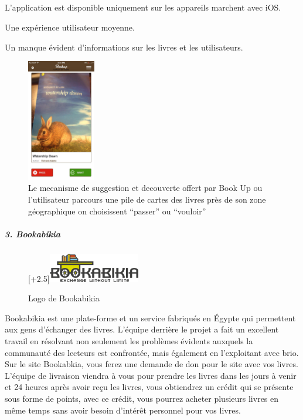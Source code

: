 \subparagraph*{}
\begin{list}{•}{\textbf{Inconvénients}}
	\item L'application est disponible uniquement sur les appareils marchent avec iOS.
	\item Une expérience utilisateur moyenne.
	\item Un manque évident d'informations sur les livres et les utilisateurs.
\end{list}

\begin{figure}[h]
	\begin{center}
		\includegraphics[width=3cm]{Images/chapter1/bookUpScreenshot.jpg}
		\caption{\footnotesize {Le mecanisme de suggestion et decouverte offert par Book Up ou l'utilisateur parcours une pile de cartes des livres près de son zone géographique on choisissent “passer” ou “vouloir”}}
	\end{center}
\end{figure}
\newpage

\subparagraph{{\large 3. Bookabikia\medskip \\}}

\begin{figure}
	\raisebox{0pt}[\dimexpr\height+2.5\baselineskip\relax]{\includegraphics[width=4cm]{Images/chapter1/bookabikiaLogo.png}}
	\caption{{\footnotesize Logo de Bookabikia}}
\end{figure}

Bookabikia est une plate-forme et un service fabriqués en Égypte qui permettent aux gens d'échanger des livres. L'équipe derrière le projet a fait un excellent travail en résolvant non seulement les problèmes évidents auxquels la communauté des lecteurs est confrontée, mais également en l'exploitant avec brio. Sur le site Bookabkia, vous ferez une demande de don pour le site avec vos livres. L’équipe de livraison viendra à vous pour prendre les livres dans les jours à venir et 24 heures après avoir reçu les livres, vous obtiendrez un crédit qui se présente sous forme de points, avec ce crédit, vous pourrez acheter plusieurs livres en même temps sans avoir besoin d’intérêt personnel pour vos livres.\cite{noauthor_bookabikia_nodate}

